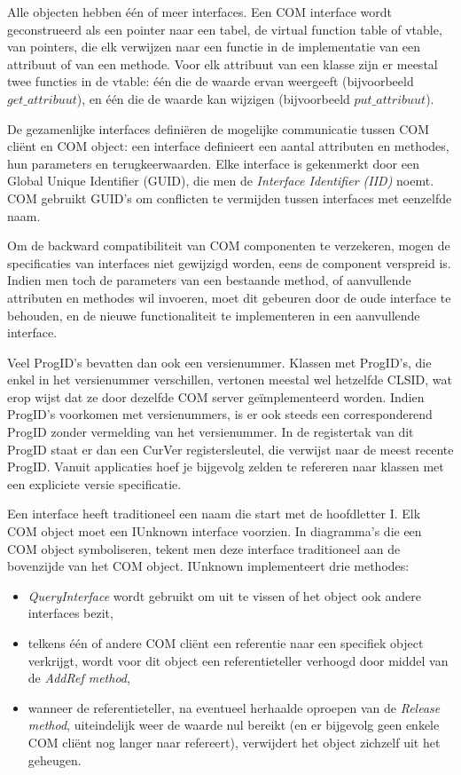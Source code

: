 \documentclass[11pt,a4paper]{report}
\begin{document}
Alle objecten hebben één of meer interfaces. Een COM interface wordt geconstrueerd als een pointer naar een tabel, de virtual function table of vtable, van pointers, die elk verwijzen naar een functie in de implementatie van een attribuut of van een methode. Voor elk attribuut van een klasse zijn er meestal twee functies in de vtable: één die de waarde ervan weergeeft (bijvoorbeeld $get\_attribuut$), en één die de waarde kan wijzigen (bijvoorbeeld $put\_attribuut$). 
\par De gezamenlijke interfaces definiëren de mogelijke communicatie tussen COM cliënt en COM object: een interface definieert een aantal attributen en methodes, hun parameters en terugkeerwaarden. Elke interface is gekenmerkt door een Global Unique Identifier (GUID), die men de \textit{Interface Identifier (IID)} noemt. COM gebruikt GUID's om conflicten te vermijden tussen interfaces met eenzelfde naam. 
\par Om de backward compatibiliteit van COM componenten te verzekeren, mogen de specificaties van interfaces niet gewijzigd worden, eens de component verspreid is. Indien men toch de parameters van een bestaande method, of aanvullende attributen en methodes wil invoeren, moet dit gebeuren door de oude interface te behouden, en de nieuwe functionaliteit te implementeren in een aanvullende interface. 
\par Veel ProgID's bevatten dan ook een versienummer. Klassen met ProgID's, die enkel in het versienummer verschillen, vertonen meestal wel hetzelfde CLSID, wat erop wijst dat ze door dezelfde COM server geïmplementeerd worden. Indien ProgID's voorkomen met versienummers, is er ook steeds een corresponderend ProgID zonder vermelding van het versienummer. In de registertak van dit ProgID staat er dan een CurVer registersleutel, die verwijst naar de meest recente ProgID. Vanuit applicaties hoef je bijgevolg zelden te refereren naar klassen met een expliciete versie specificatie.
\par Een interface heeft traditioneel een naam die start met de hoofdletter I. Elk COM object moet een IUnknown interface voorzien. In diagramma's die een COM object symboliseren, tekent men deze interface traditioneel aan de bovenzijde van het COM object. IUnknown implementeert drie methodes:
\begin{itemize} 
	\item \textit{QueryInterface} wordt gebruikt om uit te vissen of het object ook andere interfaces bezit,
\item telkens één of andere COM cliënt een referentie naar een specifiek object verkrijgt, wordt voor dit object een referentieteller verhoogd door middel van de \textit{AddRef method},
\item wanneer de referentieteller, na eventueel herhaalde oproepen van de \textit{Release method}, uiteindelijk weer de waarde nul bereikt (en er bijgevolg geen enkele COM cliënt nog langer naar refereert), verwijdert het object zichzelf uit het geheugen.

\end{itemize}
\end{document}
